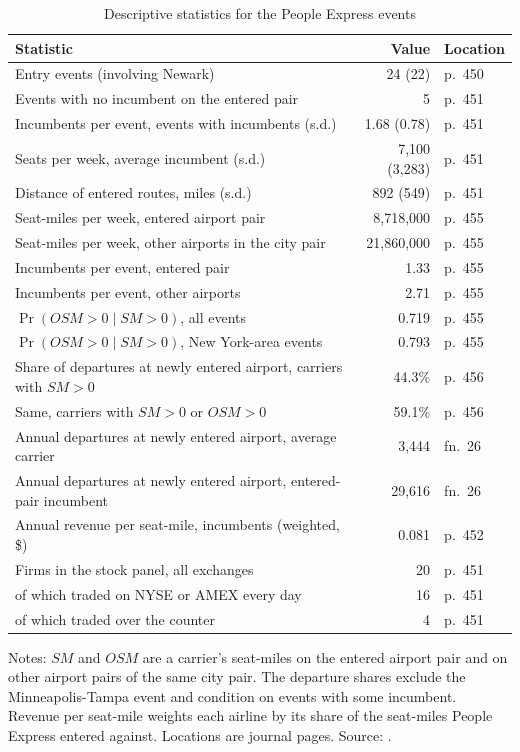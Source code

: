 \begin{table}[htbp]
\centering
\caption{Descriptive statistics for the People Express events}
\label{tab:09-wc-desc}
\small
\begin{tabular}{@{}lrl@{}}
\toprule
Statistic & Value & Location\\
\midrule
Entry events (involving Newark) & 24 (22) & p.~450\\
Events with no incumbent on the entered pair & 5 & p.~451\\
Incumbents per event, events with incumbents (s.d.) & 1.68 (0.78) & p.~451\\
Seats per week, average incumbent (s.d.) & 7,100 (3,283) & p.~451\\
Distance of entered routes, miles (s.d.) & 892 (549) & p.~451\\
\addlinespace
Seat-miles per week, entered airport pair & 8,718,000 & p.~455\\
Seat-miles per week, other airports in the city pair & 21,860,000 & p.~455\\
Incumbents per event, entered pair & 1.33 & p.~455\\
Incumbents per event, other airports & 2.71 & p.~455\\
$\Pr(\mathit{OSM}>0\mid \mathit{SM}>0)$, all events & 0.719 & p.~455\\
$\Pr(\mathit{OSM}>0\mid \mathit{SM}>0)$, New York-area events & 0.793 & p.~455\\
\addlinespace
Share of departures at newly entered airport, carriers with $\mathit{SM}>0$ & 44.3\% & p.~456\\
Same, carriers with $\mathit{SM}>0$ or $\mathit{OSM}>0$ & 59.1\% & p.~456\\
Annual departures at newly entered airport, average carrier & 3,444 & fn.~26\\
Annual departures at newly entered airport, entered-pair incumbent & 29,616 & fn.~26\\
\addlinespace
Annual revenue per seat-mile, incumbents (weighted, \$) & 0.081 & p.~452\\
Firms in the stock panel, all exchanges & 20 & p.~451\\
\quad of which traded on NYSE or AMEX every day & 16 & p.~451\\
\quad of which traded over the counter & 4 & p.~451\\
\bottomrule
\end{tabular}

\smallskip
\parbox{0.97\linewidth}{\footnotesize Notes: $\mathit{SM}$ and $\mathit{OSM}$ are a carrier's seat-miles
on the entered airport pair and on other airport pairs of the same city pair. The departure shares
exclude the Minneapolis-Tampa event and condition on events with some incumbent. Revenue per seat-mile
weights each airline by its share of the seat-miles People Express entered against. Locations are
journal pages. Source: \citet{WhinstonCollins1992}.}
\end{table}

